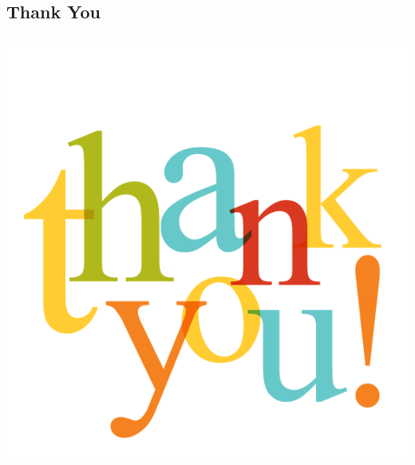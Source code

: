 \documentclass[xcolor=dvipsnames, hyperref=hidelinks, url=hyphens]{beamer}
\begin{document}
\subsection{Thank You}
\begin{frame}\frametitle{}
  \centering
    \includegraphics[scale=0.3]{images/thankyou}
    
\end{frame}

\end{document}
